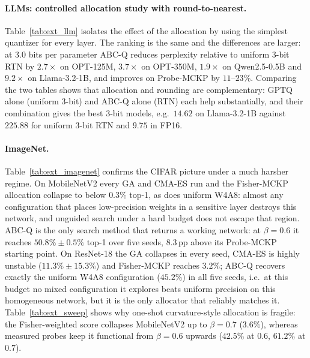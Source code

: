 \documentclass[11pt,a4paper]{article}
\begin{document}


\paragraph{LLMs: controlled allocation study with round-to-nearest.} Table~\ref{tab:ext_llm} isolates the
effect of the allocation by using the simplest quantizer for every layer. The ranking is the same and the
differences are larger: at $3.0$ bits per parameter ABC-Q reduces perplexity relative to uniform 3-bit RTN by
$2.7\times$ on OPT-125M, $3.7\times$ on OPT-350M, $1.9\times$ on Qwen2.5-0.5B and $9.2\times$ on
Llama-3.2-1B, and improves on Probe-MCKP by $11$--$23\%$. Comparing the two tables shows that allocation and
rounding are complementary: GPTQ alone (uniform 3-bit) and ABC-Q alone (RTN) each help substantially, and
their combination gives the best 3-bit models, e.g.\ $14.62$ on Llama-3.2-1B against $225.88$ for uniform
3-bit RTN and $9.75$ in FP16.



\paragraph{ImageNet.} Table~\ref{tab:ext_imagenet} confirms the CIFAR picture under a much harsher
regime. On MobileNetV2 every GA and CMA-ES run and the Fisher-MCKP allocation collapse to below $0.3\%$
top-1, as does uniform W4A8: almost any configuration that places low-precision weights in a sensitive
layer destroys this network, and unguided search under a hard budget does not escape that region.
ABC-Q is the only search method that returns a working network: at $\beta=0.6$ it reaches
$50.8\%\pm0.5\%$ top-1 over five seeds, $8.3$\,pp above its Probe-MCKP starting point. On ResNet-18 the GA
collapses in every seed, CMA-ES is highly unstable ($11.3\%\pm15.3\%$) and Fisher-MCKP reaches $3.2\%$;
ABC-Q recovers exactly the uniform W4A8 configuration ($45.2\%$) in all five seeds, i.e.\ at this budget
no mixed configuration it explores beats uniform precision on this homogeneous network, but it is the
only allocator that reliably matches it. Table~\ref{tab:ext_sweep} shows why one-shot curvature-style
allocation is fragile: the Fisher-weighted score collapses MobileNetV2 up to $\beta=0.7$ ($3.6\%$),
whereas measured probes keep it functional from $\beta=0.6$ upwards ($42.5\%$ at $0.6$, $61.2\%$ at
$0.7$).


\end{document}

